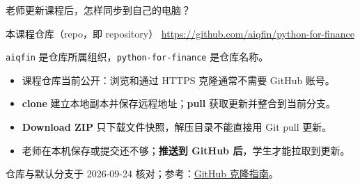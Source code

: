 \documentclass[9pt]{ctexbeamer}
\begin{document}
\begin{frame}{老师更新课程后，怎样同步到自己的电脑？}
  \begin{block}{本课程仓库（repo，即 repository）}
    \url{https://github.com/aiqfin/python-for-finance}\par
    \texttt{aiqfin} 是仓库所属组织，\texttt{python-for-finance} 是仓库名称。
  \end{block}
  \begin{center}
  \end{center}
  \begin{itemize}
    \item 课程仓库当前公开：浏览和通过 HTTPS 克隆通常不需要 GitHub 账号。
    \item \textbf{clone} 建立本地副本并保存远程地址；\textbf{pull} 获取更新并整合到当前分支。
    \item \textbf{Download ZIP} 只下载文件快照，解压目录不能直接用 Git pull 更新。
    \item 老师在本机保存或提交还不够；\textbf{推送到 GitHub 后}，学生才能拉取到更新。
  \end{itemize}
  {\tiny 仓库与默认分支于 2026-09-24 核对；参考：\href{https://docs.github.com/en/repositories/creating-and-managing-repositories/cloning-a-repository}{GitHub 克隆指南}。}
\end{frame}
\end{document}
